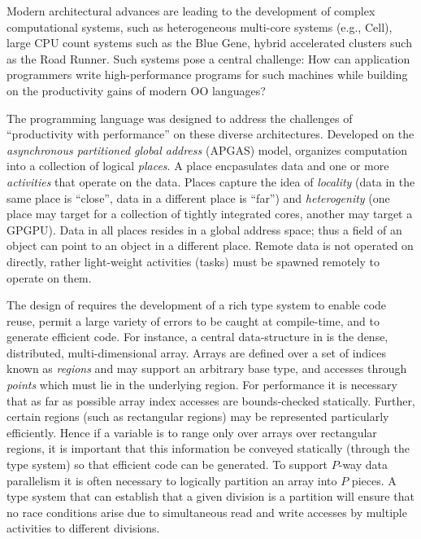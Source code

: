 
Modern architectural advances are leading to the development of
complex computational systems, such as heterogeneous multi-core
systems (e.g., Cell), large CPU count systems such as the Blue Gene,
hybrid accelerated clusters such as the Road Runner.  Such systems
pose a central challenge: How can application programmers write
high-performance programs for such machines while building on the
productivity gains of modern OO languages?

The \Xten{} programming language \cite{x10-concur,x10-oopsla05,x10} was
designed to address the challenges of ``productivity with
performance'' on these diverse architectures. Developed on
the {\em asynchronous partitioned global address} (APGAS) model, 
\Xten{} organizes computation into a collection of
logical {\em places}. A place encpasulates data and one or more {\em
activities} that operate on the data. Places capture the idea of {\em
locality} (data in the same place is ``close'', data in a different
place is ``far'') and {\em heterogenity} (one place may target for a
collection of tightly integrated cores, another may target a
GPGPU). Data in all places resides in a global address space; thus a
field of an object can point to an object in a different place. Remote
data is not operated on directly, rather light-weight activities
(tasks) must be spawned remotely to operate on them.

The design of \Xten{} requires the development of a rich type system
to enable code reuse, permit a large variety of errors to be caught at
compile-time, and to generate efficient code. For instance, a central
data-structure in \Xten{} is the dense, distributed, multi-dimensional
array. Arrays are defined over a set of indices known as {\em regions}
and may support an arbitrary base type, and accesses through {\em
points} which must lie in the underlying region. For performance it is
necessary that as far as possible array index accesses are
bounds-checked statically. Further, certain regions (such as
rectangular regions) may be represented particularly
efficiently. Hence if a variable is to range only over arrays over
rectangular regions, it is important that this information be conveyed
statically (through the type system) so that efficient code can be
generated. To support $P$-way data parallelism it is often necessary
to logically partition an array into $P$ pieces. A type system that
can establish that a given division is a partition will ensure that no
race conditions arise due to simultaneous read and write accesses by
multiple activities to different divisions.

